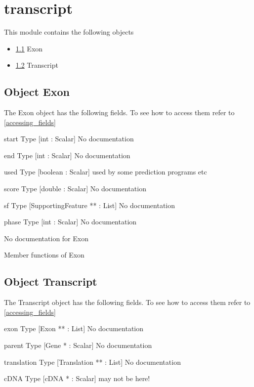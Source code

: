 \section{transcript}
\label{module_transcript}
This module contains the following objects

\begin{itemize}
\item \ref{object_Exon} Exon

\item \ref{object_Transcript} Transcript

\end{itemize}
\subsection{Object Exon}

\label{object_Exon}

The Exon object has the following fields. To see how to access them refer to \ref{accessing_fields}
\begin{description}
\item{start} Type [int : Scalar] No documentation

\item{end} Type [int : Scalar] No documentation

\item{used} Type [boolean : Scalar]  used by some prediction programs etc

\item{score} Type [double : Scalar] No documentation

\item{sf} Type [SupportingFeature ** : List] No documentation

\item{phase} Type [int : Scalar] No documentation

\end{description}
No documentation for Exon

Member functions of Exon

\subsection{Object Transcript}

\label{object_Transcript}

The Transcript object has the following fields. To see how to access them refer to \ref{accessing_fields}
\begin{description}
\item{exon} Type [Exon ** : List] No documentation

\item{parent} Type [Gene * : Scalar] No documentation

\item{translation} Type [Translation ** : List] No documentation

\item{cDNA} Type [cDNA * : Scalar]  may not be here!

\end{description}


